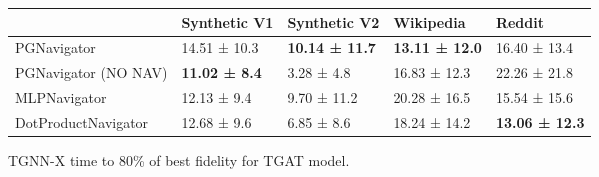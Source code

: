 \begin{tabular}{lllll}
\toprule
 & Synthetic V1 & Synthetic V2 & Wikipedia & Reddit \\
\midrule
PGNavigator & 14.51 ± 10.3 & \bfseries 10.14 ± 11.7 & \bfseries 13.11 ± 12.0 & 16.40 ± 13.4 \\
PGNavigator (NO NAV) & \bfseries 11.02 ± 8.4 & 3.28 ± 4.8 & 16.83 ± 12.3 & 22.26 ± 21.8 \\
MLPNavigator & 12.13 ± 9.4 & 9.70 ± 11.2 & 20.28 ± 16.5 & 15.54 ± 15.6 \\
DotProductNavigator & 12.68 ± 9.6 & 6.85 ± 8.6 & 18.24 ± 14.2 & \bfseries 13.06 ± 12.3 \\
\bottomrule
\end{tabular}
\caption{\label{tab:tgat_time}TGNN-X time to 80\% of best fidelity for TGAT model.}

